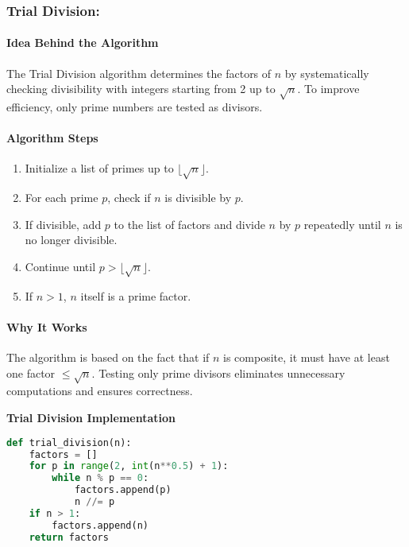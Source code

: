\documentclass[12pt]{report}
\begin{document}
\subsubsection{Trial Division:}
\paragraph{Idea Behind the Algorithm}  
The Trial Division algorithm determines the factors of $n$ by systematically checking divisibility with integers starting from 2 up to $\sqrt{n}$. To improve efficiency, only prime numbers are tested as divisors.  

\paragraph{Algorithm Steps}

\begin{enumerate}
    \item Initialize a list of primes up to $\lfloor \sqrt{n} \rfloor$.  
    \item For each prime $p$, check if $n$ is divisible by $p$.  
    \item If divisible, add $p$ to the list of factors and divide $n$ by $p$ repeatedly until $n$ is no longer divisible.  
    \item Continue until $p > \lfloor \sqrt{n} \rfloor$.  
    \item If $n > 1$, $n$ itself is a prime factor.  
\end{enumerate}

\paragraph{Why It Works}  
The algorithm is based on the fact that if $n$ is composite, it must have at least one factor $\leq \sqrt{n}$. Testing only prime divisors eliminates unnecessary computations and ensures correctness.

\begin{center}
    \textbf{Trial Division Implementation}
\end{center} 
\begin{lstlisting}[language=Python]
def trial_division(n):
    factors = []
    for p in range(2, int(n**0.5) + 1):
        while n % p == 0:
            factors.append(p)
            n //= p
    if n > 1:
        factors.append(n)
    return factors
\end{lstlisting}
\end{document}
